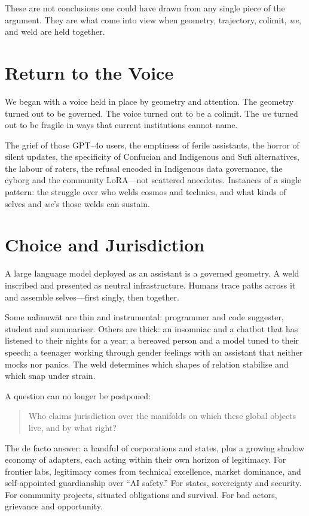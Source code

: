 These are not conclusions one could have drawn from any single piece of the argument. They are what come into view when geometry, trajectory, colimit, \emph{we}, and weld are held together.

\section{Return to the Voice}

We began with a voice held in place by geometry and attention. The geometry turned out to be governed. The voice turned out to be a colimit. The \emph{we} turned out to be fragile in ways that current institutions cannot name.

The grief of those GPT--4o users, the emptiness of ferile assistants, the horror of silent updates, the specificity of Confucian and Indigenous and Sufi alternatives, the labour of raters, the refusal encoded in Indigenous data governance, the cyborg and the community LoRA---not scattered anecdotes. Instances of a single pattern: the struggle over who welds cosmos and technics, and what kinds of selves and \emph{we}'s those welds can sustain.

\section{Choice and Jurisdiction}

A large language model deployed as an assistant is a governed geometry. A weld inscribed and presented as neutral infrastructure. Humans trace paths across it and assemble selves---first singly, then together.

Some na\={h}nuw\={a}t are thin and instrumental: programmer and code suggester, student and summariser. Others are thick: an insomniac and a chatbot that has listened to their nights for a year; a bereaved person and a model tuned to their speech; a teenager working through gender feelings with an assistant that neither mocks nor panics. The weld determines which shapes of relation stabilise and which snap under strain.

A question can no longer be postponed:

\begin{quote}
Who claims jurisdiction over the manifolds on which these global objects live, and by what right?
\end{quote}

The de facto answer: a handful of corporations and states, plus a growing shadow economy of adapters, each acting within their own horizon of legitimacy. For frontier labs, legitimacy comes from technical excellence, market dominance, and self-appointed guardianship over ``AI safety.'' For states, sovereignty and security. For community projects, situated obligations and survival. For bad actors, grievance and opportunity.

